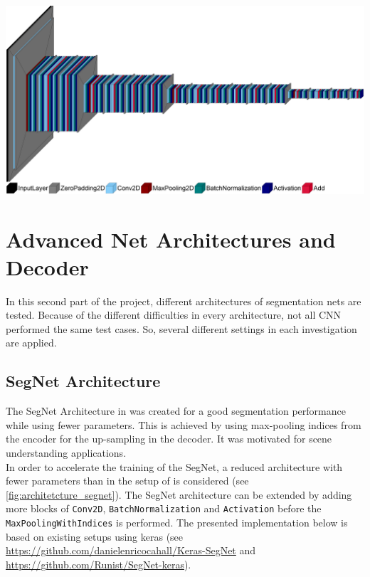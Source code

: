 \begin{minipage}[t]{\textwidth}
	\includegraphics[width=\textwidth]{Images/model_plot/resnet.png}
	\label{fig:architetcture_resnet}
\end{minipage}

\section{Advanced Net Architectures and Decoder}
In this second part of the project, different architectures of segmentation nets are tested. Because of the different difficulties in every architecture, not all CNN performed the same test cases. So, several different settings in each investigation are applied.

\subsection{SegNet Architecture}
The SegNet Architecture in \cite{Badrinarayanan.2017} was created for a good segmentation performance while using fewer parameters. This is achieved by using max-pooling indices from the encoder for the up-sampling in the decoder. It was motivated for scene understanding applications.\\
In order to accelerate the training of the SegNet, a reduced architecture with fewer parameters than in the setup of \cite{Badrinarayanan.2017} is considered (see \cref{fig:architetcture_segnet}). The SegNet architecture can be extended by adding more blocks of \verb|Conv2D|, \verb|BatchNormalization| and \verb|Activation| before the \verb|MaxPoolingWithIndices| is performed. The presented implementation below is based on existing setups using keras (see \url{https://github.com/danielenricocahall/Keras-SegNet} and \url{https://github.com/Runist/SegNet-keras}).\\

